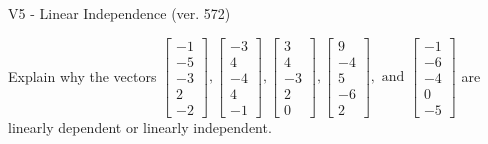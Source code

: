 \begin{exercise}
  \begin{exerciseTitle}V5 - Linear Independence (ver. 572)\end{exerciseTitle}
  \begin{exerciseStatement}
    Explain why the vectors \(\left[\begin{array}{r}
-1 \\
-5 \\
-3 \\
2 \\
-2
\end{array}\right] , \left[\begin{array}{r}
-3 \\
4 \\
-4 \\
4 \\
-1
\end{array}\right] , \left[\begin{array}{r}
3 \\
4 \\
-3 \\
2 \\
0
\end{array}\right] , \left[\begin{array}{r}
9 \\
-4 \\
5 \\
-6 \\
2
\end{array}\right] , \text{ and } \left[\begin{array}{r}
-1 \\
-6 \\
-4 \\
0 \\
-5
\end{array}\right]\) are linearly dependent or linearly independent.	



\end{exerciseStatement}
\end{exercise}
